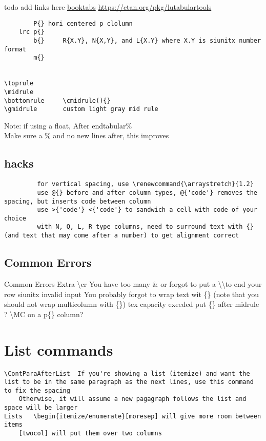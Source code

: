\documentclass{corpboreport}
\begin{document}
todo add links here
\url{booktabs}
\url{https://ctan.org/pkg/lutabulartools}

\begin{lstlisting}
		P{} hori centered p clolumn
	lrc	p{}
		b{}		R{X.Y}, N{X,Y}, and L{X.Y} where X.Y is siunitx number format
		m{}


\toprule
\midrule
\bottomrule		\cmidrule(){}
\gmidrule		custom light gray mid rule

\end{lstlisting}

Note: if using a float,
After end{tabular}\%\\
Make sure a \% and no new lines after, this improves

\subsection{hacks}
\begin{lstlisting}
		 for vertical spacing, use \renewcommand{\arraystretch}{1.2}
		 use @{} before and after column types, @{'code'} removes the spacing, but inserts code between column
		 use >{'code'} <{'code'} to sandwich a cell with code of your choice
		 with N, Q, L, R type columns, need to surround text with {} (and text that may come after a number) to get alignment correct
\end{lstlisting}


\subsection{Common Errors}
Common Errors
	Extra \textbackslash cr	You have too many \& or forgot to put a \textbackslash\textbackslash to end your row
	siunitx invalid input	You probably forgot to wrap text wit \{\}  (note that you should not wrap multicolumn with \{\})
	tex capacity exeeded	put \{\} after midrule ?
	\textbackslash MC on a p\{\} column?


\section{List commands}

\begin{lstlisting}
\ContParaAfterList	If you're showing a list (itemize) and want the list to be in the same paragraph as the next lines, use this command to fix the spacing
	Otherwise, it will assume a new pagagraph follows the list and space will be larger
Lists	\begin{itemize/enumerate}[moresep] will give more room between items
	[twocol] will put them over two columns
\end{lstlisting}
\end{document}
